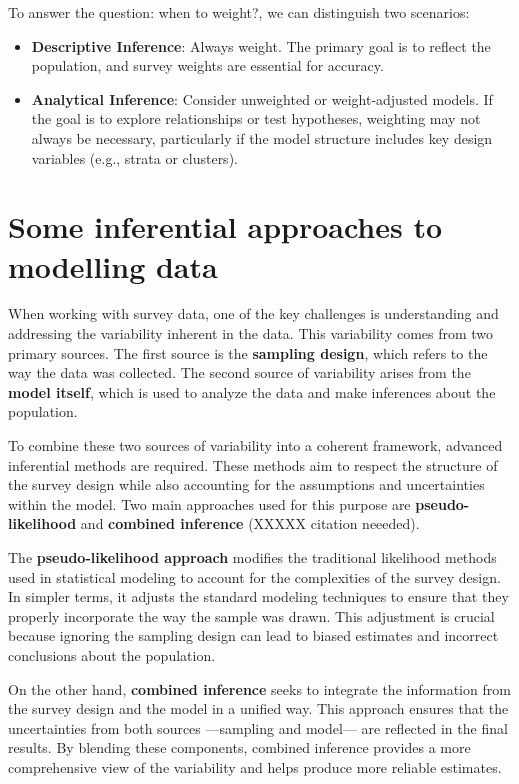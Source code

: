 \documentclass[
  12pt,
]{book}
\begin{document}
To answer the question: when to weight?, we can distinguish two scenarios:

\begin{itemize}
\item
  \textbf{Descriptive Inference}: Always weight. The primary goal is to reflect the population, and survey weights are essential for accuracy.
\item
  \textbf{Analytical Inference}: Consider unweighted or weight-adjusted models. If the goal is to explore relationships or test hypotheses, weighting may not always be necessary, particularly if the model structure includes key design variables (e.g., strata or clusters).
\end{itemize}

\hypertarget{some-inferential-approaches-to-modelling-data}{%
\section{Some inferential approaches to modelling data}\label{some-inferential-approaches-to-modelling-data}}

When working with survey data, one of the key challenges is understanding and addressing the variability inherent in the data. This variability comes from two primary sources. The first source is the \textbf{sampling design}, which refers to the way the data was collected. The second source of variability arises from the \textbf{model itself}, which is used to analyze the data and make inferences about the population.

To combine these two sources of variability into a coherent framework, advanced inferential methods are required. These methods aim to respect the structure of the survey design while also accounting for the assumptions and uncertainties within the model. Two main approaches used for this purpose are \textbf{pseudo-likelihood} and \textbf{combined inference} (XXXXX citation neeeded).

The \textbf{pseudo-likelihood approach} modifies the traditional likelihood methods used in statistical modeling to account for the complexities of the survey design. In simpler terms, it adjusts the standard modeling techniques to ensure that they properly incorporate the way the sample was drawn. This adjustment is crucial because ignoring the sampling design can lead to biased estimates and incorrect conclusions about the population.

On the other hand, \textbf{combined inference} seeks to integrate the information from the survey design and the model in a unified way. This approach ensures that the uncertainties from both sources ---sampling and model--- are reflected in the final results. By blending these components, combined inference provides a more comprehensive view of the variability and helps produce more reliable estimates.
\end{document}
